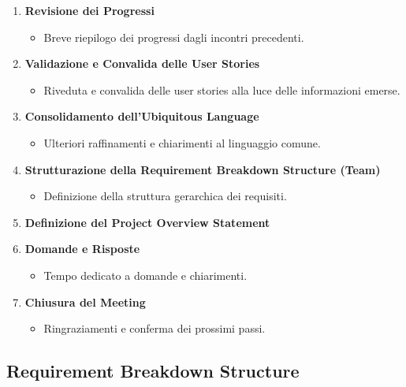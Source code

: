 \begin{enumerate}
    \item \textbf{Revisione dei Progressi}
          \begin{itemize}
              \item Breve riepilogo dei progressi dagli incontri precedenti.
          \end{itemize}

    \item \textbf{Validazione e Convalida delle User Stories}
          \begin{itemize}
              \item Riveduta e convalida delle user stories alla luce delle informazioni emerse.
          \end{itemize}

    \item \textbf{Consolidamento dell'Ubiquitous Language}
          \begin{itemize}
              \item Ulteriori raffinamenti e chiarimenti al linguaggio comune.
          \end{itemize}

    \item \textbf{Strutturazione della Requirement Breakdown Structure (Team)}
          \begin{itemize}
              \item Definizione della struttura gerarchica dei requisiti.
          \end{itemize}

    \item \textbf{Definizione del Project Overview Statement}

    \item \textbf{Domande e Risposte}
          \begin{itemize}
              \item Tempo dedicato a domande e chiarimenti.
          \end{itemize}

    \item \textbf{Chiusura del Meeting}
          \begin{itemize}
              \item Ringraziamenti e conferma dei prossimi passi.
          \end{itemize}
\end{enumerate}

\subsection{Requirement Breakdown Structure}

